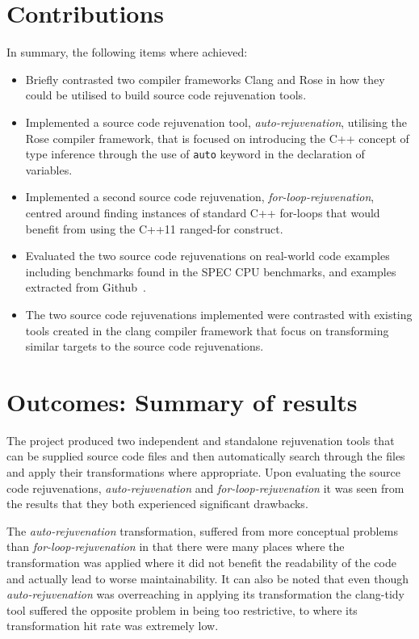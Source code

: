 \documentclass[bsc,frontabs,singlespacing,twoside,parskip,deptreport]{infthesis}
\begin{document}
    
\section{Contributions}
In summary, the following items where achieved:
\begin{itemize}
    \item Briefly contrasted two compiler frameworks Clang and Rose in how they could be utilised to build source code rejuvenation tools.
    \item Implemented a source code rejuvenation tool, \textit{auto-rejuvenation}, utilising the Rose compiler framework, that is focused on introducing the C++ concept of type inference through the use of \texttt{auto} keyword in the declaration of variables.
    \item Implemented a second source code rejuvenation, \textit{for-loop-rejuvenation}, centred around finding instances of standard  C++ for-loops that would benefit from using the C++11 ranged-for construct. 
    \item Evaluated the two source code rejuvenations on real-world code examples including benchmarks found in the SPEC CPU benchmarks, and examples extracted from Github~\cite{GITHUB}. 
    \item The two source code rejuvenations implemented were contrasted with existing tools created in the clang compiler framework that focus on transforming similar targets to the source code rejuvenations.  
\end{itemize}

\section{Outcomes: Summary of results}

The project produced two independent and standalone rejuvenation tools that can be supplied source code files and then automatically search through the files and apply their transformations where appropriate. Upon evaluating the source code rejuvenations, \textit{auto-rejuvenation} and \textit{for-loop-rejuvenation} it was seen from the results that they both experienced significant drawbacks.

The \textit{auto-rejuvenation} transformation, suffered from more conceptual problems than \textit{for-loop-rejuvenation} in that there were many places where the transformation was applied where it did not benefit the readability of the code and actually lead to worse maintainability. It can also be noted that even though \textit{auto-rejuvenation} was overreaching in applying its transformation the clang-tidy tool suffered the opposite problem in being too restrictive, to where its transformation hit rate was extremely low.  
\end{document}
